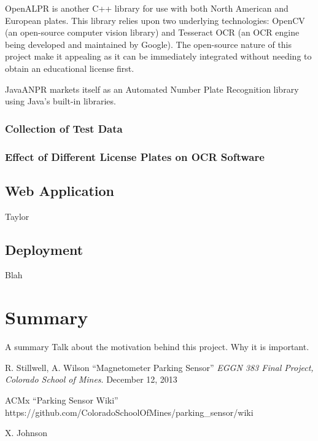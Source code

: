 \documentclass[11pt, oneside, fullpage, doublespace]{article}
\begin{document}
OpenALPR is another C++ library for use with both North American and European plates. This library relies upon two underlying technologies: OpenCV (an open-source computer vision library) and Tesseract OCR (an OCR engine being developed and maintained by Google). The open-source nature of this project make it appealing as it can be immediately integrated without needing to obtain an educational license first.

JavaANPR markets itself as an Automated Number Plate Recognition library using Java's built-in libraries. 

\subsubsection{Collection of Test Data}

\subsubsection{Effect of Different License Plates on OCR Software}



\subsection{Web Application}
Taylor


\subsection{Deployment}
Blah


\section{Summary}
A summary \cite{johnson2012} Talk about the motivation behind this project. Why it is important.


\begin{thebibliography}{99}
 R. Stillwell, A. Wilson ``Magnetometer Parking Sensor'' \emph{EGGN 383 Final Project, Colorado School of Mines}. December 12, 2013

  ACMx ``Parking Sensor Wiki'' https://github.com/ColoradoSchoolOfMines/parking\_sensor/wiki


 X. Johnson
\end{thebibliography}
\end{document}
